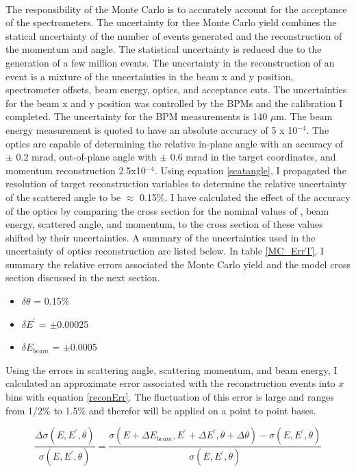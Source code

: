 \paragraph{}The responsibility of the Monte Carlo is to accurately account for the acceptance of the spectrometers. The uncertainty for thee Monte Carlo yield combines the statical uncertainty of the number of events generated and the reconstruction of the momentum and angle.  The statistical uncertainty is reduced due to the generation of a few million events. The uncertainty in the reconstruction of an event is a mixture of the uncertainties in the beam x and y position, spectrometer offsets, beam energy, optics, and acceptance cuts. The uncertainties for the beam x and y position was controlled by the BPMs and the calibration I completed. The uncertainty for the BPM measurements is 140 $\mu$m. The beam energy measurement is quoted to have an absolute accuracy of 5 x 10$^{-4}$.  The optics are capable of determining the relative in-plane angle with an accuracy of $\pm$ 0.2 mrad, out-of-plane angle with $\pm$ 0.6 mrad in the target coordinates, and momentum reconstruction 2.5x10$^{-4}$\cite{HallA}.  Using equation \ref{scatangle}, I propagated the resolution of target reconstruction variables to determine the relative uncertainty of the scattered angle to be $\approx$ 0.15\%. I have calculated the effect of the accuracy of the optics by comparing the cross section for the nominal values of , beam energy, scattered angle, and momentum, to the cross section of these values shifted by their uncertainties. A summary of the uncertainties used in the uncertainty of optics reconstruction are listed below. In table \ref{MC_ErrT}, I summary the relative errors associated the Monte Carlo yield and the model cross section discussed in the next section. 
\begin{itemize}
\item$\delta \theta$ = 0.15\%
\item$\delta E^{\prime}$ = $\pm$0.00025
\item$\delta E_{beam}$ = $\pm$0.0005
\end{itemize}
Using the errors in scattering angle, scattering momentum, and beam energy, I calculated an approximate error associated with the reconstruction events into $x$ bins with equation \ref{reconErr}. The fluctuation of this error is large and ranges from 1/2\% to 1.5\% and therefor will be applied on a point to point bases. 

\begin{equation}
\frac{\Delta \sigma(E,E^{\prime},\theta)}{ \sigma(E,E^{\prime},\theta)} = \frac{\sigma(E+\Delta E_{beam},E^{\prime}+\Delta E^{\prime},\theta+\Delta \theta) - \sigma(E,E^{\prime},\theta)}{\sigma(E,E^{\prime},\theta)} \label{reconErr}
\end{equation}

